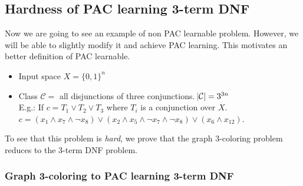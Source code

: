 \documentclass[12pt, letterpaper]{article}
\numberwithin{equation}{section} %
\newcommand{\mc}{\mathcal}
\theoremstyle{definition}
\theoremstyle{remark}
\begin{document}
\subsection{Hardness of PAC learning 3-term DNF}

Now we are going to see an example of non PAC learnable problem.
However, we will be able to slightly modify it and achieve PAC learning.
This motivates an better definition of PAC learnable.
\begin{itemize}
    \item Input space $X = \lbrace 0, 1 \rbrace^n$
    \item Class $\mc C = $ all disjunctions of three conjunctions. $\abs{\mc C} = 3^{3n}$\\
          E.g.: If $c = T_1 \lor T_2 \lor T_3$ where $T_i$ is a conjunction over $X$.\\
          $c = \left(x_1 \wedge x_7 \wedge \lnot x_8 \right) \lor \left(x_2 \wedge x_5 \wedge \lnot x_7 \wedge \lnot x_8\right) \lor \left(x_6 \wedge x_{12}\right)$.
\end{itemize}
To see that this problem is \emph{hard}, we prove that the graph 3-coloring problem reduces to the 3-term DNF problem.

\subsubsection*{Graph 3-coloring to PAC learning 3-term DNF}
\end{document}
